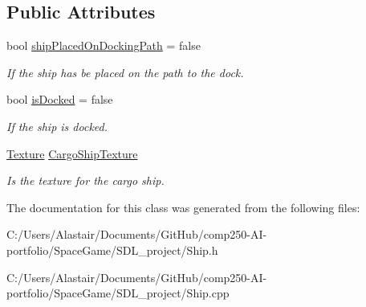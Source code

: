 \subsection*{Public Attributes}
\begin{DoxyCompactItemize}
\item 
\mbox{\label{class_ship_a37c2a087a444a12e1fe7917251fd7f26}} 
bool \hyperlink{class_ship_a37c2a087a444a12e1fe7917251fd7f26}{ship\+Placed\+On\+Docking\+Path} = false
\begin{DoxyCompactList}\small\item\em If the ship has be placed on the path to the dock. \end{DoxyCompactList}\item 
\mbox{\label{class_ship_a9df053208d5a04dbe31186ad7e6008bd}} 
bool \hyperlink{class_ship_a9df053208d5a04dbe31186ad7e6008bd}{is\+Docked} = false
\begin{DoxyCompactList}\small\item\em If the ship is docked. \end{DoxyCompactList}\item 
\mbox{\label{class_ship_a8c6c6302e1a88d4902176ee6c6a7a4e2}} 
\hyperlink{class_texture}{Texture} \hyperlink{class_ship_a8c6c6302e1a88d4902176ee6c6a7a4e2}{Cargo\+Ship\+Texture}
\begin{DoxyCompactList}\small\item\em Is the texture for the cargo ship. \end{DoxyCompactList}\end{DoxyCompactItemize}


The documentation for this class was generated from the following files\+:\begin{DoxyCompactItemize}
\item 
C\+:/\+Users/\+Alastair/\+Documents/\+Git\+Hub/comp250-\/\+A\+I-\/portfolio/\+Space\+Game/\+S\+D\+L\+\_\+project/Ship.\+h\item 
C\+:/\+Users/\+Alastair/\+Documents/\+Git\+Hub/comp250-\/\+A\+I-\/portfolio/\+Space\+Game/\+S\+D\+L\+\_\+project/Ship.\+cpp\end{DoxyCompactItemize}
